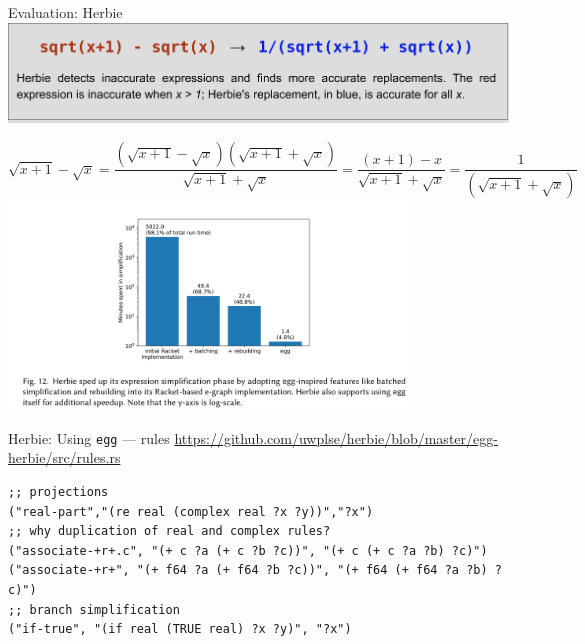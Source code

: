 \documentclass[8pt]{beamer}
\newcommand{\egg}{\texttt{egg} }
\begin{document}
\begin{frame}{Evaluation: Herbie}
\includegraphics[width=\textwidth]{./herbie-sales-pitch.png}
\pause

$$
\sqrt{x+1}-\sqrt{x} =
\frac{(\sqrt{x+1}-\sqrt{x})(\sqrt{x+1}+\sqrt{x})}{\sqrt{x+1}+\sqrt{x}}
= \frac{(x+1)-x}{\sqrt{x+1}+\sqrt{x}} = \frac{1}{(\sqrt{x+1}+\sqrt{x})}
$$
\pause
\includegraphics[width=0.8\textwidth]{./herbie-speedup.png}

\end{frame}

\begin{frame}[fragile]{Herbie: Using \egg --- rules}
\url{https://github.com/uwplse/herbie/blob/master/egg-herbie/src/rules.rs}

\begin{verbatim}
;; projections
("real-part","(re real (complex real ?x ?y))","?x")
;; why duplication of real and complex rules?
("associate-+r+.c", "(+ c ?a (+ c ?b ?c))", "(+ c (+ c ?a ?b) ?c)")
("associate-+r+", "(+ f64 ?a (+ f64 ?b ?c))", "(+ f64 (+ f64 ?a ?b) ?c)")
;; branch simplification
("if-true", "(if real (TRUE real) ?x ?y)", "?x")
\end{verbatim}
\end{frame}
\end{document}
